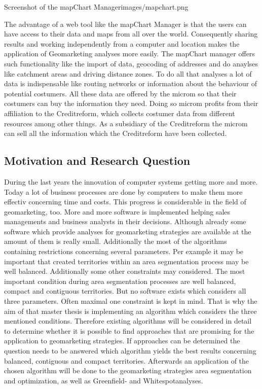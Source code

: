 \begin{figureOwn}{Screenshot of the mapChart Manager}{images/mapchart.png}\end{figureOwn}

The advantage of a web tool like the mapChart Manager is that the users can have access to their data and maps from all over the world. Consequently sharing results and working independently from a computer and location makes the application of Geomarketing analyses more easily. The mapChart manager offers such functionality like the import of data, geocoding of addresses and do anaylses like catchment areas and driving distance zones. To do all that analyses a lot of data is indispensable  like routing networks or information about the behaviour of potential costumers. All these data are offered by the microm so that their costumers can buy the information they need. Doing so microm profits from their affiliation to the Creditreform, which collects costumer data from different resources among other things. As a subsidiary of the Creditreform the microm can sell all the information which the Creditreform have been collected.

\subsection{Motivation and Research Question}
During the last years the innovation of computer systems getting more and more. Today a lot of business processes are done by computers to make them more effectiv concerning time and costs. This progress is considerable in the field of geomarketing, too. More and more software is implemented helping sales managements and business analysts in their decisions. Although already some software which provide analyses for geomarketing strategies are available at the amount of them is really small. Additionally the most of the algorithms containing restrictions concerning several parameters. Per example it may be important that created territories within an area segmentation process may be well balanced. Additionally some other constraints may considered. The most important condition during area segmentation processes are well balanced, compact and contiguous territories. But no software exists which considers all three parameters. Often maximal one constraint is kept in mind. That is why the aim of that master thesis is implementing an algorithm which considers the three mentioned conditions. Therefore existing algorithms will be considered in detail to determine whether it is possible to find approaches that are promising for the application to geomarketing strategies. If approaches can be determined the question needs to be answered which algorithm yields the best results concerning balanced, contiguous and compact territories. Afterwards an application of the chosen algorithm will be done to the geomarketing strategies area segmentation and optimization, as well as Greenfield- and Whitespotanalyses.

